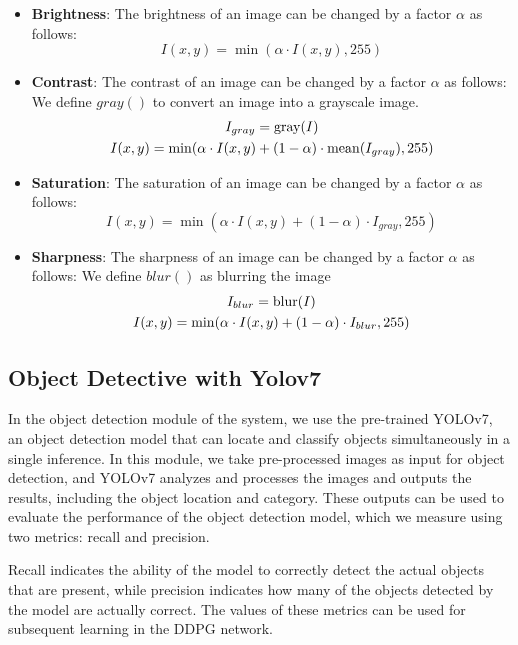 \documentclass[PhD]{PHlab-thesis}
\begin{document}
\begin{itemize}
\item \textbf{Brightness}: The brightness of an image can be changed by a factor $\alpha$ as follows:
\begin{equation}
I(x,y)=\min(\alpha\cdot I(x,y),255)
\end{equation}

\item \textbf{Contrast}: The contrast of an image can be changed by a factor $\alpha$ as follows: We define $gray()$ to convert an image into a grayscale image.
\begin{gather}
I_{gray}=\text{gray}(I)\notag \\
I(x,y)=\min(\alpha\cdot I(x,y)+(1-\alpha)\cdot\mathrm{mean}(I_{gray}),255)
\end{gather}

\item \textbf{Saturation}: The saturation of an image can be changed by a factor $\alpha$ as follows:
\begin{equation}
I(x,y)=\min(\alpha\cdot I(x,y)+(1-\alpha)\cdot I_{gray},255)
\end{equation}

\item \textbf{Sharpness}: The sharpness of an image can be changed by a factor $\alpha$ as follows: We define $blur()$ as blurring the image
\begin{gather}
I_{blur}=\text{blur}(I) \notag \\
I(x,y)=\min(\alpha\cdot I(x,y)+(1-\alpha)\cdot I_{blur},255)
\end{gather}
\end{itemize}

\subsection{Object Detective with Yolov7}
In the object detection module of the system, we use the pre-trained YOLOv7, an object detection model that can locate and classify objects simultaneously in a single inference. In this module, we take pre-processed images as input for object detection, and YOLOv7 analyzes and processes the images and outputs the results, including the object location and category. These outputs can be used to evaluate the performance of the object detection model, which we measure using two metrics: recall and precision.

Recall indicates the ability of the model to correctly detect the actual objects that are present, while precision indicates how many of the objects detected by the model are actually correct. The values of these metrics can be used for subsequent learning in the DDPG network.
\end{document}
